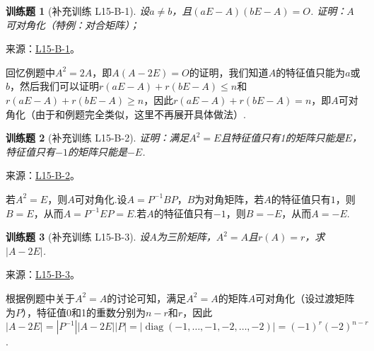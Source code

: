 \documentclass[12pt,fontset=fandol]{ctexart}
\newtheorem{exercise}{训练题}[section]
\begin{document}
\begin{exercise}[补充训练 L15-B-1]\label{prob:L15-B-1}
设$a\neq b$，且$(aE-A)(bE-A)=O$. 证明：$A$可对角化（特例：对合矩阵）；
\end{exercise}
\noindent 来源：\href{https://github.com/yhwu-is/Linear-Algebra-Left-Undone/blob/new/%E8%AE%B2%E4%B9%89/%E4%B8%93%E9%A2%98/15%20%E7%9B%B8%E4%BC%BC%E6%A0%87%E5%87%86%E5%BD%A2%EF%BC%9A%E5%A4%8D%E6%95%B0%E5%9F%9F%E4%B8%8A%E7%9A%84%E5%B0%9D%E8%AF%95%E4%B8%8E%E7%90%86%E8%AE%BA.tex}{L15-B-1}。
\begin{solve}
回忆例题中$A^2=2A$，即$A(A-2E)=O$的证明，我们知道$A$的特征值只能为$a$或$b$，然后我们可以证明$r(aE-A)+r(bE-A)\leqslant n$和$r(aE-A)+r(bE-A)\geqslant n$，因此$r(aE-A)+r(bE-A)=n$，即$A$可对角化（由于和例题完全类似，这里不再展开具体做法）.
\end{solve}

\begin{exercise}[补充训练 L15-B-2]\label{prob:L15-B-2}
证明：满足$A^2=E$且特征值只有1的矩阵只能是$E$，特征值只有$-1$的矩阵只能是$-E$.
\end{exercise}
\noindent 来源：\href{https://github.com/yhwu-is/Linear-Algebra-Left-Undone/blob/new/%E8%AE%B2%E4%B9%89/%E4%B8%93%E9%A2%98/15%20%E7%9B%B8%E4%BC%BC%E6%A0%87%E5%87%86%E5%BD%A2%EF%BC%9A%E5%A4%8D%E6%95%B0%E5%9F%9F%E4%B8%8A%E7%9A%84%E5%B0%9D%E8%AF%95%E4%B8%8E%E7%90%86%E8%AE%BA.tex}{L15-B-2}。
\begin{solve}
若$A^2=E$，则$A$可对角化.设$A=P^{-1}BP$，$B$为对角矩阵，若$A$的特征值只有$1$，则$B=E$，从而$A=P^{-1}EP=E$.若$A$的特征值只有$-1$，则$B=-E$，从而$A=-E$.
\end{solve}

\begin{exercise}[补充训练 L15-B-3]\label{prob:L15-B-3}
设$A$为三阶矩阵，$A^2=A$且$r(A)=r$，求$|A-2E|$.
\end{exercise}
\noindent 来源：\href{https://github.com/yhwu-is/Linear-Algebra-Left-Undone/blob/new/%E8%AE%B2%E4%B9%89/%E4%B8%93%E9%A2%98/15%20%E7%9B%B8%E4%BC%BC%E6%A0%87%E5%87%86%E5%BD%A2%EF%BC%9A%E5%A4%8D%E6%95%B0%E5%9F%9F%E4%B8%8A%E7%9A%84%E5%B0%9D%E8%AF%95%E4%B8%8E%E7%90%86%E8%AE%BA.tex}{L15-B-3}。
\begin{solve}
根据例题中关于$A^2=A$的讨论可知，满足$A^2=A$的矩阵$A$可对角化（设过渡矩阵为$P$），特征值0和1的重数分别为$n-r$和$r$，因此$|A-2E|=|P^{-1}||A-2E||P|=|\operatorname{diag}(-1,\ldots,-1,-2,\ldots,-2)|=(-1)^r(-2)^{n-r}$.
\end{solve}
\end{document}
